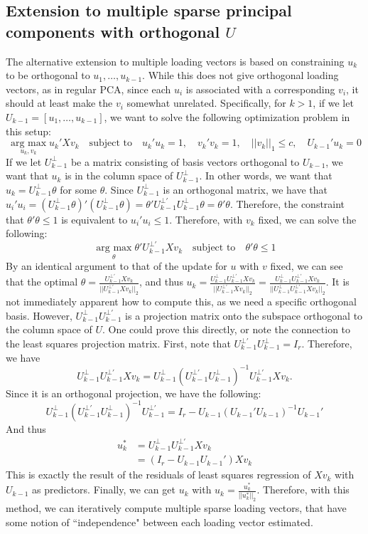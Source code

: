\documentclass[11pt]{article}
\newcommand{\argmax}{\operatorname*{arg \ max}}
\begin{document}
\subsection{Extension to multiple sparse principal components with orthogonal $U$}
The alternative extension to multiple loading vectors is based on constraining $u_k$ to be orthogonal to $u_1, \dots, u_{k - 1}$. While this does not give orthogonal loading vectors, as in regular PCA, since each $u_i$ is associated with a corresponding $v_i$, it should at least make the $v_i$ somewhat unrelated. Specifically, for $k > 1$, if we let $U_{k - 1} = \left[u_1, \dots, u_{k - 1} \right]$, we want to solve the following optimization problem in this setup:
$$
\argmax_{u_k, v_k} u_k'Xv_k \quad \text{subject to} \quad u_k'u_k = 1, \quad v_k'v_k = 1, \quad ||v_k||_1 \leq c, \quad U_{k - 1}'u_k	 = 0
$$
If we let $U_{k - 1}^{\bot}$ be a matrix consisting of basis vectors orthogonal to $U_{k - 1}$, we want that $u_k$ is in the column space of $U_{k - 1}^{\bot}$. In other words, we want that $u_k = U_{k - 1}^{\bot} \theta$ for some $\theta$. Since $U_{k - 1}^{\bot}$ is an orthogonal matrix, we have that $u_i'u_i = (U_{k - 1}^{\bot} \theta)'(U_{k - 1}^{\bot} \theta) = \theta' U_{k - 1}^{\bot'}U_{k - 1}^{\bot} \theta = \theta'\theta$. Therefore, the constraint that $\theta'\theta \leq 1$ is equivalent to $u_i'u_i \leq 1$. Therefore, with $v_k$ fixed, we can solve the following:
$$
\argmax_{\theta} \theta'U_{k - 1}^{\bot'}Xv_k \quad \text{subject to} \quad \theta'\theta \leq 1
$$
By an identical argument to that of the update for $u$ with $v$ fixed, we can see that the optimal $\theta = \frac{U_{k - 1}^{\bot'}Xv_k}{||U_{k - 1}^{\bot'}Xv_k||_2}$, and thus $u_k =  \frac{U_{k - 1}^{\bot}U_{k - 1}^{\bot'}Xv_k}{||U_{k - 1}^{\bot'}Xv_k||_2} =  \frac{U_{k - 1}^{\bot}U_{k - 1}^{\bot'}Xv_k}{||U_{k - 1}^{\bot}U_{k - 1}^{\bot'}Xv_k||_2}$. It is not immediately apparent how to compute this, as we need a specific orthogonal basis. However, $U_{k - 1}^{\bot}U_{k - 1}^{\bot'}$ is a projection matrix onto the subspace orthogonal to the column space of $U$. One could prove this directly, or note the connection to the least squares projection matrix. First, note that $U_{k - 1}^{\bot'}U_{k - 1}^{\bot} = I_r$. Therefore, we have
$$
U_{k - 1}^{\bot}U_{k - 1}^{\bot'}Xv_k = U_{k - 1}^{\bot}(U_{k - 1}^{\bot'}U_{k - 1}^{\bot})^{-1}U_{k - 1}^{\bot'}Xv_k.
$$
Since it is an orthogonal projection, we have the following:
$$
U_{k - 1}^{\bot}(U_{k - 1}^{\bot'}U_{k - 1}^{\bot})^{-1}U_{k - 1}^{\bot'} = I_r - U_{k - 1}(U_{k - 1}'U_{k - 1})^{-1}U_{k - 1}'
$$
And thus
\begin{align*}
u_k^{*} &= U_{k - 1}^{\bot}U_{k - 1}^{\bot'}Xv_k \\
&= (I_r - U_{k - 1}U_{k - 1}')Xv_k
\end{align*}
This is exactly the result of the residuals of least squares regression of $Xv_k$ with $U_{k - 1}$ as predictors. Finally, we can get $u_k$ with $u_k = \frac{u_k^{*}}{||u_k^{*}||_2}$.
Therefore, with this method, we can iteratively compute multiple sparse loading vectors, that have some notion of ``independence" between each loading vector estimated.
\end{document}
